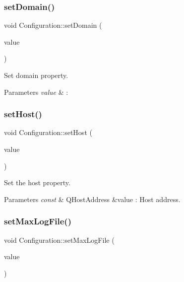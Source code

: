 \subsubsection{\texorpdfstring{set\+Domain()}{setDomain()}}
{\footnotesize\ttfamily void Configuration\+::set\+Domain (\begin{DoxyParamCaption}\item[{const Q\+String \&}]{value }\end{DoxyParamCaption})}



Set domain property. 


\begin{DoxyParams}{Parameters}
{\em value} & \+: \\
\hline
\end{DoxyParams}
\mbox{\label{class_configuration_a0851c4f93476b80acebd88204c4a86c6}} 
\subsubsection{\texorpdfstring{set\+Host()}{setHost()}}
{\footnotesize\ttfamily void Configuration\+::set\+Host (\begin{DoxyParamCaption}\item[{const Q\+Host\+Address \&}]{value }\end{DoxyParamCaption})}



Set the host property. 


\begin{DoxyParams}{Parameters}
{\em const} & Q\+Host\+Address \&value \+: Host address. \\
\hline
\end{DoxyParams}
\mbox{\label{class_configuration_a3c26bb11f458d7374fd4c5b53e181aee}} 
\subsubsection{\texorpdfstring{set\+Max\+Log\+File()}{setMaxLogFile()}}
{\footnotesize\ttfamily void Configuration\+::set\+Max\+Log\+File (\begin{DoxyParamCaption}\item[{const qint64 \&}]{value }\end{DoxyParamCaption})}




